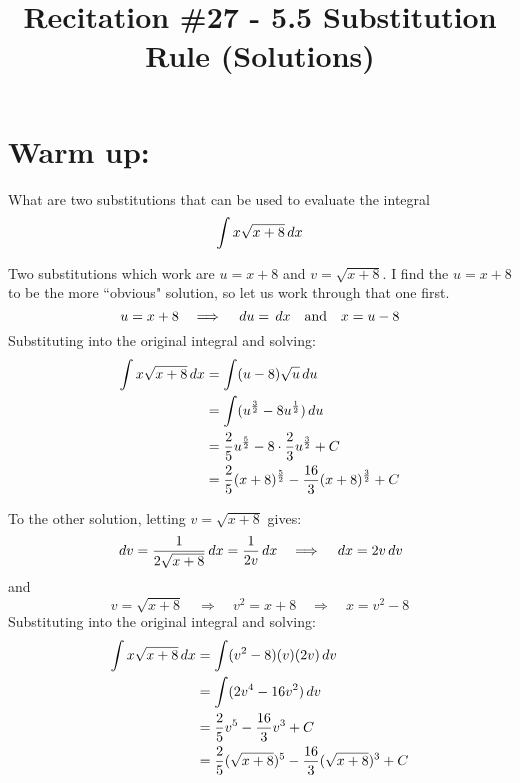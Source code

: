 \documentclass[nooutcomes]{ximera}
\title{Recitation \#27 - 5.5 Substitution Rule (Solutions)}
\begin{document}
\begin{abstract}		\end{abstract}
\maketitle

\section*{Warm up:} 
What are two substitutions that can be used to evaluate the integral
	\begin{equation*}
	\int x \sqrt{x+8} \,d x
	\end{equation*}
	
		\begin{freeResponse}
		Two substitutions which work are $u=x+8$ and $v=\sqrt{x+8}$.  
		I find the $u=x+8$ to be the more ``obvious" solution, so let us work through that one first.
		\begin{equation*}
		u=x+8 \quad \Longrightarrow \quad \,d u = \,d x \quad \text{and} \quad x = u-8
		\end{equation*}
		Substituting into the original integral and solving:
		\begin{align*}
		\int x \sqrt{x+8} \,d x &= \int (u-8) \sqrt{u} \,d u  \\
		&= \int (u^{\frac{3}{2}} - 8u^{\frac{1}{2}} ) \,d u  \\
		&= \frac{2}{5} u^{\frac{5}{2}} - 8 \cdot \frac{2}{3} u^{\frac{3}{2}} + C  \\
		&= \frac{2}{5} (x+8)^{\frac{5}{2}} - \frac{16}{3} (x+8)^{\frac{3}{2}} + C
		\end{align*}
		
		To the other solution, letting $v=\sqrt{x+8}$ gives:
		\begin{equation*}
		\,d v = \frac{1}{2 \sqrt{x+8}} \,d x = \frac{1}{2v} \,d x 	\quad	\Longrightarrow \quad \,d x = 2v \,d v
		\end{equation*}
		and
		\begin{equation*}
		v = \sqrt{x+8} \quad \Longrightarrow \quad v^2 = x+8 \quad \Longrightarrow \quad x= v^2-8
		\end{equation*}
		Substituting into the original integral and solving:
		\begin{align*}
		\int x \sqrt{x+8} \,d x &= \int (v^2-8)(v)(2v)\,d v  \\
		&= \int (2v^4 - 16v^2) \,d v  \\
		&= \frac{2}{5} v^5 - \frac{16}{3} v^3 + C  \\
		&= \frac{2}{5} (\sqrt{x+8})^5 - \frac{16}{3} (\sqrt{x+8})^3 + C
		\end{align*}
		
		\end{freeResponse}	
		
\end{document}
